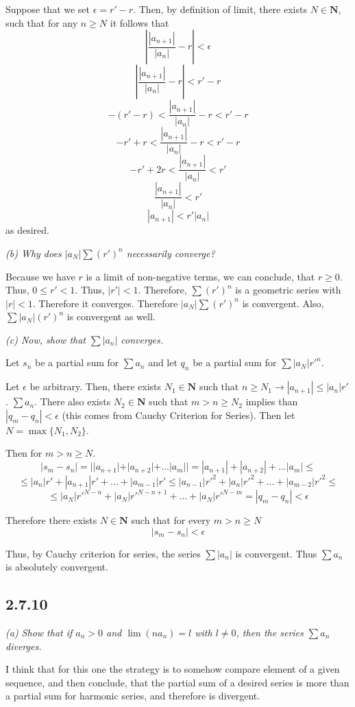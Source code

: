 \documentclass[11pt,oneside,titlepage]{book}
\begin{document}
Suppose that we set $\epsilon = r' - r$. Then, by definition of limit, there
exists $N \in \textbf{N}$, such that for any $n \geq N$ it follows that 
$$|\frac{|a_{n + 1}|}{|a_n|} - r| < \epsilon$$
$$|\frac{|a_{n + 1}|}{|a_n|} - r| < r' - r$$
$$- (r' - r) < \frac{|a_{n + 1}|}{|a_n|} - r < r' - r$$
$$- r' +  r < \frac{|a_{n + 1}|}{|a_n|} - r < r' - r$$
$$- r' + 2r < \frac{|a_{n + 1}|}{|a_n|}  < r'$$
$$\frac{|a_{n + 1}|}{|a_n|}  < r'$$
$$|a_{n + 1}|  < r'|a_n|$$
as desired.

\textit{(b) Why does $|a_N|\sum(r')^n$ necessarily converge? }

Because we have $r$ is a limit of non-negative terms, we can conclude,
that $r \geq 0$. Thus, $0 \leq r'  < 1$. Thus, $|r'| < 1$. Therefore,
$\sum(r')^n$ is a geometric series with $|r| < 1$. Therefore it converges.
Therefore $|a_N| \sum(r')^n$ is convergent. Also, $\sum |a_N| (r')^n$ is
convergent as well.

\textit{(c) Now, show that $\sum |a_n|$ converges.}


Let $s_n$ be a partial sum for $\sum a_n$ and let $q_n$ be a partial sum
for $\sum |a_N| r'^n$.

Let $\epsilon$ be arbitrary. Then, there
exists $N_1 \in \textbf{N}$ such that
$n \geq N_1 \to |a_{n + 1}| \leq |a_n|r'$.
$\sum a_n$. There also exists $N_2 \in \textbf{N}$ such that $m > n \geq N_2$
implies than $|q_m - q_n| < \epsilon$ (this comes from Cauchy Criterion for
Series). Then let  $N = \max\{N_1, N_2\}$.

Then for $m > n \geq N$.
$$|s_m - s_n| = ||a_{n + 1}| + |a_{n + 2}| + ... |a_m|| =
|a_{n + 1}| + |a_{n + 2}| + ... |a_m| \leq$$
$$\leq|a_n|r' + |a_{n + 1}|r' +
... + |a_{m - 1}|r' \leq |a_{n - 1}|r'^2 + |a_{n}|r'^2 + ... +
|a_{m - 2}|r'^2 \leq$$
$$\leq |a_N|r'^{N - n} + |a_N|r'^{N - n + 1} + ... + |a_N|r'^{N - m} =
|q_m - q_n| < \epsilon$$

Therefore there exists $N \in \textbf{N}$ such that for every $m > n \geq N$
$$|s_m - s_n| < \epsilon$$

Thus, by Cauchy criterion for series, the  series $\sum |a_n|$ is convergent.
Thus $\sum a_n$ is absolutely convergent.

\subsection*{2.7.10}
\textit{(a) Show that if $a_n > 0$ and $\lim(na_n) = l$ with $l \neq 0$,
  then the series $\sum a_n$ diverges. }

I think that for this one the strategy is to somehow compare element
of a given  sequence, and then conclude, that the partial sum of a desired
series is more than a partial sum for harmonic series, and therefore is
divergent.
\end{document}
